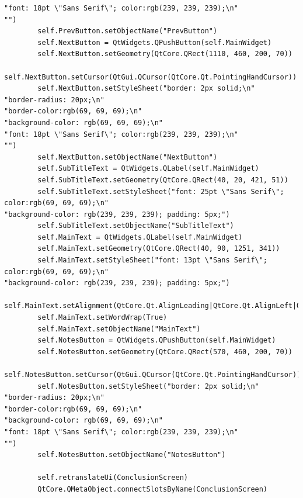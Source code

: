 \documentclass{article}
\begin{document}
\begin{lstlisting}
"font: 18pt \"Sans Serif\"; color:rgb(239, 239, 239);\n"
"")
        self.PrevButton.setObjectName("PrevButton")
        self.NextButton = QtWidgets.QPushButton(self.MainWidget)
        self.NextButton.setGeometry(QtCore.QRect(1110, 460, 200, 70))
        self.NextButton.setCursor(QtGui.QCursor(QtCore.Qt.PointingHandCursor))
        self.NextButton.setStyleSheet("border: 2px solid;\n"
"border-radius: 20px;\n"
"border-color:rgb(69, 69, 69);\n"
"background-color: rgb(69, 69, 69);\n"
"font: 18pt \"Sans Serif\"; color:rgb(239, 239, 239);\n"
"")
        self.NextButton.setObjectName("NextButton")
        self.SubTitleText = QtWidgets.QLabel(self.MainWidget)
        self.SubTitleText.setGeometry(QtCore.QRect(40, 20, 421, 51))
        self.SubTitleText.setStyleSheet("font: 25pt \"Sans Serif\"; color:rgb(69, 69, 69);\n"
"background-color: rgb(239, 239, 239); padding: 5px;")
        self.SubTitleText.setObjectName("SubTitleText")
        self.MainText = QtWidgets.QLabel(self.MainWidget)
        self.MainText.setGeometry(QtCore.QRect(40, 90, 1251, 341))
        self.MainText.setStyleSheet("font: 13pt \"Sans Serif\"; color:rgb(69, 69, 69);\n"
"background-color: rgb(239, 239, 239); padding: 5px;")
        self.MainText.setAlignment(QtCore.Qt.AlignLeading|QtCore.Qt.AlignLeft|QtCore.Qt.AlignTop)
        self.MainText.setWordWrap(True)
        self.MainText.setObjectName("MainText")
        self.NotesButton = QtWidgets.QPushButton(self.MainWidget)
        self.NotesButton.setGeometry(QtCore.QRect(570, 460, 200, 70))
        self.NotesButton.setCursor(QtGui.QCursor(QtCore.Qt.PointingHandCursor))
        self.NotesButton.setStyleSheet("border: 2px solid;\n"
"border-radius: 20px;\n"
"border-color:rgb(69, 69, 69);\n"
"background-color: rgb(69, 69, 69);\n"
"font: 18pt \"Sans Serif\"; color:rgb(239, 239, 239);\n"
"")
        self.NotesButton.setObjectName("NotesButton")

        self.retranslateUi(ConclusionScreen)
        QtCore.QMetaObject.connectSlotsByName(ConclusionScreen)


\end{lstlisting}
\end{document}
